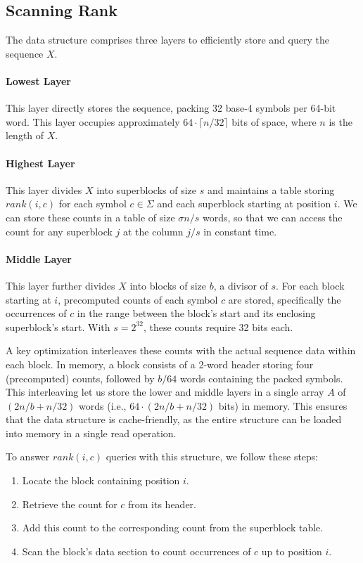 \subsection{Scanning Rank}

The data structure comprises three layers to efficiently store and query the sequence \(X\).

\paragraph{Lowest Layer}
This layer directly stores the sequence, packing 32 base-4 symbols per 64-bit word. This layer occupies approximately $64 \cdot \lceil n/32 \rceil$ bits of space, where \(n\) is the length of \(X\).

\paragraph{Highest Layer}
This layer divides \(X\) into superblocks of size \(s\) and maintains a table storing $rank(i,c)$ for each symbol $c \in \Sigma$ and each superblock starting at position \(i\). We can store these counts in a table of size $\sigma n / s$ words, so that we can access the count for any superblock $j$ at the column $j/s$ in constant time.


\paragraph{Middle Layer}
This layer further divides \(X\) into blocks of size \(b\), a divisor of \(s\). For each block starting at \(i\), precomputed counts of each symbol \(c\) are stored, specifically the occurrences of \(c\) in the range between the block's start and its enclosing superblock's start. With \(s=2^{32}\), these counts require 32 bits each. \vspace{0.4cm}

\noindent A key optimization interleaves these counts with the actual sequence data within each block. In memory, a block consists of a 2-word header storing four (precomputed) counts, followed by \(b/64\) words containing the packed symbols. This interleaving let us store the lower and middle layers in a single array $A$ of $(2n/b + n/32)$ words (i.e., $64 \cdot (2n/b + n/32)$ bits) in memory. This ensures that the data structure is cache-friendly, as the entire structure can be loaded into memory in a single read operation. \vspace{0.4cm}

\noindent To answer \(rank(i,c)\) queries with this structure, we follow these steps:
\begin{enumerate}
    \item Locate the block containing position \(i\).
    \item Retrieve the count for \(c\) from its header.
    \item Add this count to the corresponding count from the superblock table.
    \item Scan the block's data section to count occurrences of \(c\) up to position \(i\).
\end{enumerate}

